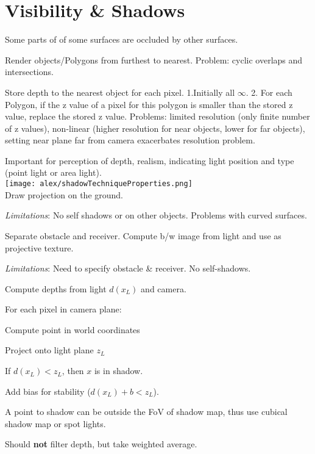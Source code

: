 \section{Visibility \& Shadows}

 Some parts of of some surfaces are occluded by other surfaces.

 Render objects/Polygons from furthest to nearest. Problem: cyclic overlaps and intersections.

 Store depth to the nearest object for each pixel. 1.Initially all $\infty$. 2. For each Polygon, if the z value of a pixel for this polygon is smaller than the stored z value, replace the stored z value. Problems: limited resolution (only finite number of z values), non-linear (higher resolution for near objects, lower for far objects), setting near plane far from camera exacerbates resolution problem.

 Important for perception of depth, realism, indicating light position and type (point light or area light).\\
\texttt{[image: alex/shadowTechniqueProperties.png]}\\

    Draw projection on the ground.
  
    \textit{Limitations}:
    No self shadows or on other objects.
    Problems with curved surfaces.
  
  
    Separate obstacle and receiver. Compute b/w image from light and use as projective texture.
  
    \textit{Limitations}:
    Need to specify obstacle \& receiver.
    No self-shadows.
  
  
  \begin{compactenum}
    \item Compute depths from light \(d(x_L)\) and camera.
    \item For each pixel in camera plane:
    \begin{compactenum}
      \item Compute point in world coordinates
      \item Project onto light plane \(z_L\)
      \item If \(d(x_L) < z_L\), then \(x\) is in shadow.
    \end{compactenum}
    \item Add bias for stability (\(d(x_L) + b < z_L\)).
    \item A point to shadow can be outside the FoV of shadow map, thus use cubical shadow map or spot lights.
    \item Should \textbf{not} filter depth, but take weighted average.
  \end{compactenum}
  
